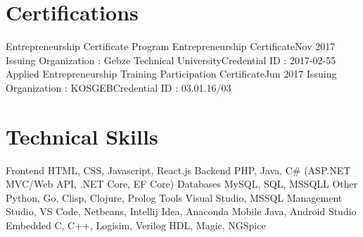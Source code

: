 \documentclass{main} %
\begin{document}
\section{Certifications}
    \resumeSubHeadingListStart
        \resumeSubheading
            {Entrepreneurship Certificate Program Entrepreneurship Certificate}{Nov 2017}
            {Issuing Organization : Gebze Technical University}{Credential ID : 2017-02-55}
        \resumeSubheading
            {Applied Entrepreneurship Training Participation Certificate}{Jun 2017}
            {Issuing Organization : KOSGEB}{Credential ID : 03.01.16/03}
    \resumeSubHeadingListEnd

\section{Technical Skills}
    \resumeSubHeadingListStart
        \resumeSubheading
            {Frontend}{}
            {HTML, CSS, Javascript, React.js}{}
        \resumeSubheading
            {Backend}{}
            {PHP, Java, C\# (ASP.NET MVC/Web API, .NET Core, EF Core)}{}
        \resumeSubheading
            {Databases}{}
            {MySQL, SQL, MSSQLL}{}
        \resumeSubheading
            {Other}{}
            {Python, Go, Clisp, Clojure, Prolog}{}
        \resumeSubheading
            {Tools}{}
            {Visual Studio, MSSQL Management Studio, VS Code, Netbeans, Intellij Idea, Anaconda}{}
        \resumeSubheading
            {Mobile}{}
            {Java, Android Studio}{}
        \resumeSubheading
            {Embedded}{}
            {C, C++, Logisim, Verilog HDL, Magic, NGSpice}{}
    \resumeSubHeadingListEnd
\end{document}
